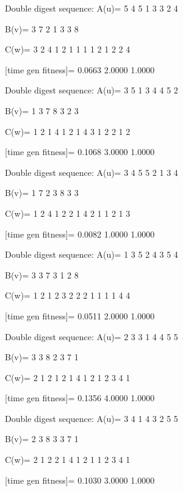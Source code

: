 Double digest sequence:
A(u)=
     5     4     5     1     3     3     2     4

B(v)=
     3     7     2     1     3     3     8

C(w)=
     3     2     4     1     2     1     1     1     1     2     1     2     2     4

[time gen fitness]=
    0.0663    2.0000    1.0000

Double digest sequence:
A(u)=
     3     5     1     3     4     4     5     2

B(v)=
     1     3     7     8     3     2     3

C(w)=
     1     2     1     4     1     2     1     4     3     1     2     2     1     2

[time gen fitness]=
    0.1068    3.0000    1.0000

Double digest sequence:
A(u)=
     3     4     5     5     2     1     3     4

B(v)=
     1     7     2     3     8     3     3

C(w)=
     1     2     4     1     2     2     1     4     2     1     1     2     1     3

[time gen fitness]=
    0.0082    1.0000    1.0000

Double digest sequence:
A(u)=
     1     3     5     2     4     3     5     4

B(v)=
     3     3     7     3     1     2     8

C(w)=
     1     2     1     2     3     2     2     2     1     1     1     1     4     4

[time gen fitness]=
    0.0511    2.0000    1.0000

Double digest sequence:
A(u)=
     2     3     3     1     4     4     5     5

B(v)=
     3     3     8     2     3     7     1

C(w)=
     2     1     2     1     2     1     4     1     2     1     2     3     4     1

[time gen fitness]=
    0.1356    4.0000    1.0000

Double digest sequence:
A(u)=
     3     4     1     4     3     2     5     5

B(v)=
     2     3     8     3     3     7     1

C(w)=
     2     1     2     2     1     4     1     2     1     1     2     3     4     1

[time gen fitness]=
    0.1030    3.0000    1.0000

